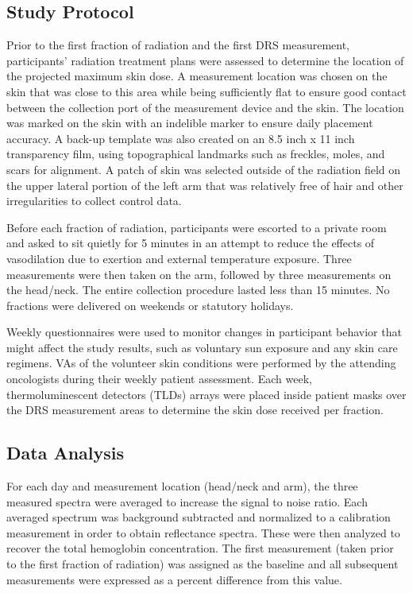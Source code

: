 \subsection{Study Protocol}
Prior to the first fraction of radiation and the first DRS measurement, participants’ radiation treatment plans were assessed to determine the location of the projected maximum skin dose. A measurement location was chosen on the skin that was close to this area while being sufficiently flat to ensure good contact between the collection port of the measurement device and the skin. The location was marked on the skin with an indelible marker to ensure daily placement accuracy. A back-up template was also created on an 8.5 inch x 11 inch transparency film, using topographical landmarks such as freckles, moles, and scars for alignment. A patch of skin was selected outside of the radiation field on the upper lateral portion of the left arm that was relatively free of hair and other irregularities to collect control data.

Before each fraction of radiation, participants were escorted to a private room and asked to sit quietly for 5 minutes in an attempt to reduce the effects of vasodilation due to exertion and external temperature exposure. Three measurements were then taken on the arm, followed by three measurements on the head/neck. The entire collection procedure lasted less than 15 minutes. No fractions were delivered on weekends or statutory holidays.

Weekly questionnaires were used to monitor changes in participant behavior that might affect the study results, such as voluntary sun exposure and any skin care regimens. VAs of the volunteer skin conditions were performed by the attending oncologists during their weekly patient assessment. Each week, thermoluminescent detectors (TLDs) arrays were placed inside patient masks over the DRS measurement areas to determine the skin dose received per fraction.

\subsection{Data Analysis}
For each day and measurement location (head/neck and arm), the three measured spectra were averaged to increase the signal to noise ratio.\cite{Fullerton1996} Each averaged spectrum was background subtracted and normalized to a calibration measurement in order to obtain reflectance spectra. These were then analyzed to recover the total hemoglobin concentration. The first measurement (taken prior to the first fraction of radiation) was assigned as the baseline and all subsequent measurements were expressed as a percent difference from this value.

